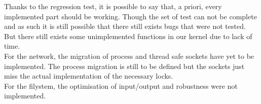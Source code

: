 Thanks to the regression test, it is possible to say that, a priori, every
implemented part should be working. Though the set of test can not be
complete and as such it is still possible that there still exists bugs
that were not tested.\\ But there still exists some unimplemented
functions in our kernel due to lack of time.\\ For the network, the
migration of process and thread safe sockets have yet to be implemented.
The process migration is still to be defined but the sockets just miss the
actual implementation of the necessary locks.\\ For the filystem, the
optimisation of input/output and robustness were not implemented.\\
